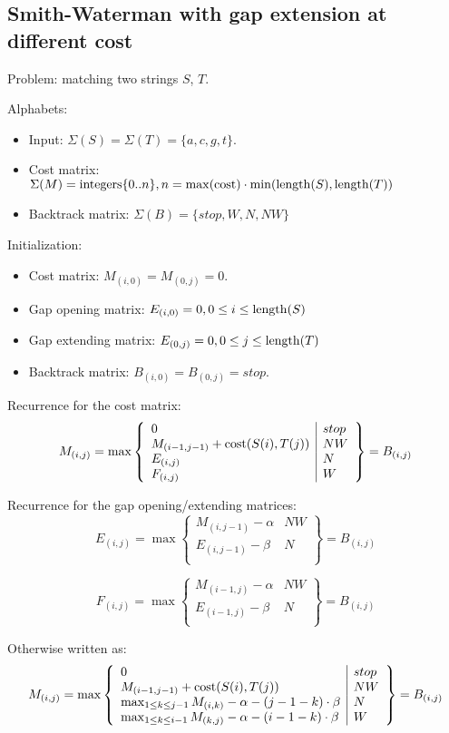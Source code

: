 \documentclass[11pt]{article}
\def\ul{\begin{itemize}}
\def\ule{\end{itemize}}
\begin{document}
\subsection{Smith-Waterman with gap extension at different cost}
Problem: matching two strings $S$, $T$.

Alphabets:\ul
\item Input: $\Sigma(S)=\Sigma(T)=\{a,c,g,t\}$.
\item Cost matrix: $\Sigma(M) = {\rm integers} \{0..n\}, n=\max({\rm cost}) \cdot \min({\rm length}(S),{\rm length}(T))$
\item Backtrack matrix: $\Sigma(B)=\{stop,W,N,NW\}$
\ule

Initialization:\ul
\item Cost matrix: $M_{(i,0)}=M_{(0,j)}=0$.
\item Gap opening matrix: $E_{(i,0)}= 0, 0 \le i \le {\rm length}(S)$
\item Gap extending matrix: $E_{(0,j)}= 0, 0 \le j \le {\rm length}(T)$
\item Backtrack matrix: $B_{(i,0)}=B_{(0,j)}=stop$.
\ule

Recurrence for the cost matrix:
\[M_{(i,j)}=\max\left\{\begin{array}{l|l}
	0 & stop\\
	M_{(i-1,j-1)}+{\rm cost}(S(i),T(j)) & NW\\
	E_{(i,j)} & N\\
	F_{(i,j)} & W
\end{array}\right\}=B_{(i,j)} \]

Recurrence for the gap opening/extending matrices:
\[E_{(i,j)}=\max\left\{\begin{array}{l|l}
	M_{(i, j-1)} - \alpha & NW\\
	E_{(i,j-1)} - \beta & N\\
\end{array}\right\}=B_{(i,j)} \]

\[F_{(i,j)}=\max\left\{\begin{array}{l|l}
	M_{(i-1, j)} - \alpha & NW\\
	E_{(i-1,j)} - \beta & N\\
\end{array}\right\}=B_{(i,j)} \]


Otherwise written as:
\[M_{(i,j)}=\max\left\{\begin{array}{l|l}
	0 & stop\\
	M_{(i-1,j-1)}+{\rm cost}(S(i),T(j)) & NW\\
	\max_{1 \le k \le j-1} M_{(i,k)} - \alpha - (j-1-k) \cdot \beta & N\\
	\max_{1 \le k \le i-1} M_{(k,j)} - \alpha - (i-1-k) \cdot \beta & W\\
\end{array}\right\}=B_{(i,j)} \]
\end{document}
